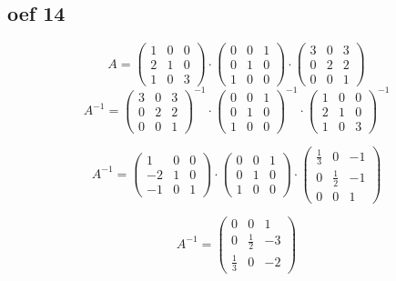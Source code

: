 \documentclass[lineaire_algebra_oplossingen.tex]{subfiles}
\begin{document}
\subsection{oef 14}
$$
A = 
\begin{pmatrix}
1 & 0 & 0\\
2 & 1 & 0\\
1 & 0 & 3
\end{pmatrix}
\cdot
\begin{pmatrix}
0 & 0 & 1\\
0 & 1 & 0\\
1 & 0 & 0
\end{pmatrix}
\cdot
\begin{pmatrix}
3 & 0 & 3\\
0 & 2 & 2\\
0 & 0 & 1  
\end{pmatrix}
$$
$$
A^{-1} = 
\begin{pmatrix}
3 & 0 & 3\\
0 & 2 & 2\\
0 & 0 & 1  
\end{pmatrix}^{-1}
\cdot
\begin{pmatrix}
0 & 0 & 1\\
0 & 1 & 0\\
1 & 0 & 0
\end{pmatrix}^{-1}
\cdot
\begin{pmatrix}
1 & 0 & 0\\
2 & 1 & 0\\
1 & 0 & 3
\end{pmatrix}^{-1}
$$

$$
A^{-1}=
\begin{pmatrix}
1 & 0 & 0\\
-2 & 1 & 0\\
-1 & 0 & 1
\end{pmatrix}
\cdot
\begin{pmatrix}
0 & 0 & 1\\
0 & 1 & 0\\
1 & 0 & 0
\end{pmatrix}
\cdot
\begin{pmatrix}
\frac{1}{3} & 0 & -1\\
0 & \frac{1}{2} & -1\\
0 & 0 & 1
\end{pmatrix}
$$

$$
A^{-1}=
\begin{pmatrix}
0 & 0 & 1\\
0 & \frac{1}{2} & -3\\
\frac{1}{3} & 0 & -2
\end{pmatrix}
$$
\end{document}
